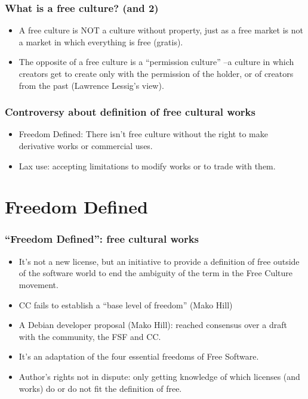 \documentclass{beamer}
\begin{document}
\begin{frame}
\frametitle{What is a free culture? (and 2)}
\begin{itemize}
\item \alert{A free culture is NOT a culture without property}, just as a free market is not a
market in which everything is free (gratis). 
\item  The opposite of a free culture is a ``\alert{permission culture}'' --a culture in which creators get to create only with the permission of the holder, or of creators from the past (Lawrence Lessig's view).

\end{itemize}

\end{frame}



\begin{frame}
\frametitle{Controversy about definition of free cultural works}

\begin{itemize}
\item \alert{Freedom Defined}: There isn't free culture without the right to make derivative works or commercial uses.
\item \alert{Lax use}: accepting limitations to modify works or to trade with them.
\end{itemize}                                                 

\end{frame}


\section{Freedom Defined}

\begin{frame}
\frametitle{``Freedom Defined'': free cultural works}

\begin{itemize}
\item \alert{It's not a new license}, but an initiative to provide a definition of \alert{free} outside of the software world to end the \alert{ambiguity of the term} in the Free Culture movement.
\item CC fails to establish a ``base level of freedom'' (Mako Hill)
\item A Debian developer proposal (Mako Hill): reached consensus over a draft with the community, the FSF and CC. 
\item It's an adaptation of the four essential freedoms of Free Software.
\item Author's rights not in dispute: only getting knowledge of which licenses (and works) do or do not fit the definition of \alert{free}.
\end{itemize}                                                 

\end{frame}
\end{document}
